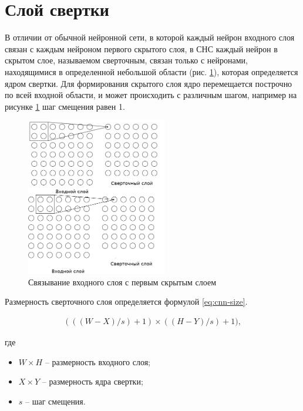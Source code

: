 \section*{Слой свертки}

В отличии от обычной нейронной сети, в которой каждый нейрон входного слоя связан с каждым нейроном первого скрытого слоя, в СНС каждый нейрон в скрытом слое, называемом сверточным, связан только с нейронами, находящимися в определенной небольшой области (рис. \ref{anal:CNN-first}), которая определяется ядром свертки. Для формирования скрытого слоя ядро перемещается построчно по всей входной области, и может происходить с различным шагом, например на рисунке \ref{anal:CNN-first} шаг смещения равен 1.

\begin{figure}[!h]
	\centering
	\includegraphics[width=0.55\textwidth]{inc/img/cnn-first.png}
	\caption{Связывание входного слоя с первым скрытым слоем}
	\label{anal:CNN-first}
\end{figure}

Размерность сверточного слоя определяется формулой \ref{eq:cnn-size}.

\begin{eqnarray}\label{eq:cnn-size}
(((W - X) / s) + 1) \times ((H - Y) / s) + 1), 
\end{eqnarray}

где

\begin{itemize}
	\item $W \times H$ -- размерность входного слоя;
	\item $X \times Y$ -- размерность ядра свертки;
	\item $s$ -- шаг смещения.
\end{itemize}

